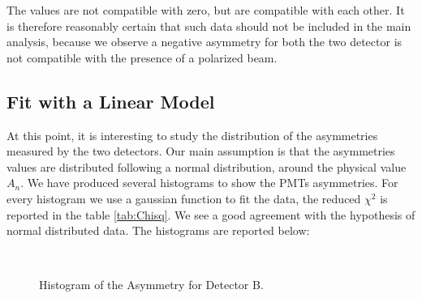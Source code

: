 The values are not compatible with zero, but are compatible with each other. It is therefore reasonably certain that such data should not be included in the main analysis, because we observe a negative asymmetry for both the two detector is not compatible with the presence of a polarized beam.

\subsection{Fit with a Linear Model}

At this point, it is interesting to study the distribution of the asymmetries measured by the two detectors. Our main assumption is that the asymmetries values are distributed following a normal distribution, around the physical value $A_{n}$. We have produced several histograms to show the PMTs asymmetries. For every histogram we use a gaussian function to fit the data, the reduced $\chi^{2}$ is reported in the table \ref{tab:Chisq}.
We see a good agreement with the hypothesis of normal distributed data. The histograms are reported below:

\begin{figure}[!ht]
\centering
{}
\\
\caption{Histogram of the Asymmetry for Detector B.}
\end{figure}

